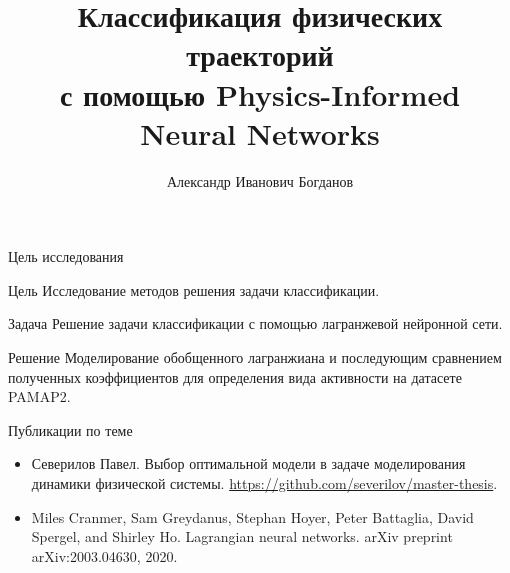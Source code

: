 \documentclass{beamer}
\title[\hbox to 56mm{Классификация физических траекторий}]{Классификация физических траекторий\\ с помощью Physics-Informed Neural Networks}
\author[А.\,И.~Богданов]{Александр Иванович Богданов}
\institute{Московский физико-технический институт}
\date{\footnotesize
\par\smallskip\emph{Курс:} Моя первая научная статья
\par\smallskip\emph{Эксперт:} В.\,В.~Стрижов
\par\smallskip\emph{Консультант:} С.\,К.~Панченко
\par\bigskip\small 2023}
\begin{document}

\begin{frame}

    \thispagestyle{empty}
    \maketitle
    
\end{frame}


\begin{frame}{Цель исследования}
    \begin{block}{Цель}
        Исследование методов решения задачи классификации.
    \end{block}
    \begin{block}{Задача}
        Решение задачи классификации с помощью лагранжевой нейронной сети.
    \end{block}
    \begin{block}{Решение}
        Моделирование обобщенного лагранжиана и последующим сравнением полученных коэффициентов для определения вида активности на датасете PAMAP2.
    \end{block}
\end{frame}


\begin{frame}{Публикации по теме}
    \begin{itemize}
    
    \item Северилов Павел. Выбор оптимальной модели в задаче моделирования динамики физической системы. \url{https://github.com/severilov/master-thesis}.

    \item Miles Cranmer, Sam Greydanus, Stephan Hoyer, Peter Battaglia, David Spergel, and Shirley Ho. Lagrangian neural networks. arXiv preprint arXiv:2003.04630, 2020.
  
    \end{itemize}
\end{frame}

\end{document}
